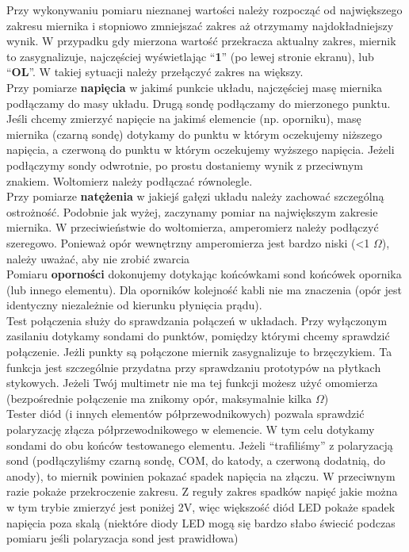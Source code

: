 \documentclass{pdfBooklets}
\begin{document}
Przy wykonywaniu pomiaru nieznanej wartości należy rozpocząć od największego zakresu miernika i stopniowo zmniejszać zakres aż
otrzymamy najdokładniejszy wynik. W przypadku gdy mierzona wartość przekracza aktualny zakres, miernik to zasygnalizuje, najczęściej
wyświetlając ``\textbf{1}'' (po lewej stronie ekranu), lub ``\textbf{OL}''. W takiej sytuacji należy przełączyć zakres na większy.
\\

Przy pomiarze \textbf{napięcia} w jakimś punkcie układu, najczęściej masę miernika
podłączamy do masy układu. Drugą sondę podłączamy do mierzonego punktu. Jeśli chcemy zmierzyć napięcie na jakimś elemencie (np. oporniku),
masę miernika (czarną sondę) dotykamy do punktu w którym oczekujemy niższego napięcia, a czerwoną do punktu w którym oczekujemy
wyższego napięcia. Jeżeli podłączymy sondy odwrotnie, po prostu dostaniemy wynik z przeciwnym znakiem. Woltomierz należy podłączać równolegle.
\\

Przy pomiarze \textbf{natężenia} w jakiejś gałęzi układu należy zachować szczególną ostrożność. Podobnie jak wyżej, zaczynamy pomiar na największym
zakresie miernika. W przeciwieństwie do woltomierza, amperomierz należy podłączyć szeregowo. Ponieważ opór wewnętrzny amperomierza jest bardzo
niski (<1 $\Omega$), należy uważać, aby nie zrobić zwarcia
\\

Pomiaru \textbf{oporności} dokonujemy dotykając końcówkami sond końcówek opornika (lub innego elementu). Dla oporników kolejność kabli nie ma znaczenia
(opór jest identyczny niezależnie od kierunku płynięcia prądu).
\\

Test połączenia służy do sprawdzania połączeń w układach. Przy wyłączonym zasilaniu dotykamy sondami do punktów, pomiędzy którymi chcemy
sprawdzić połączenie. Jeżli punkty są połączone miernik zasygnalizuje to brzęczykiem. Ta funkcja jest szczególnie przydatna przy sprawdzaniu
prototypów na płytkach stykowych. Jeżeli Twój multimetr nie ma tej funkcji możesz użyć omomierza (bezpośrednie połączenie ma znikomy opór,
maksymalnie kilka $\Omega$)
\\

Tester diód (i innych elementów półprzewodnikowych) pozwala sprawdzić polaryzację złącza półprzewodnikowego w elemencie. W tym celu dotykamy
sondami do obu końców testowanego elementu. Jeżeli ``trafiliśmy'' z polaryzacją sond (podłączyliśmy czarną sondę, COM, do katody, a czerwoną
dodatnią, do anody), to miernik powinien pokazać spadek napięcia na złączu.
W przeciwnym razie pokaże przekroczenie zakresu. Z reguły zakres spadków napięć jakie można w tym trybie zmierzyć jest poniżej 2V, więc
większość diód LED pokaże spadek napięcia poza skalą (niektóre diody LED mogą się bardzo słabo świecić podczas pomiaru jeśli polaryzacja
sond jest prawidłowa)
\end{document}
